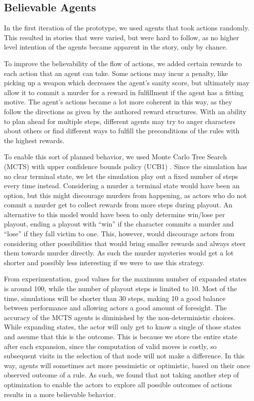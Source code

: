\subsection{Believable Agents}
In the first iteration of the prototype, we used agents that took actions randomly. This resulted in stories that were varied, but were hard to follow, as no higher level intention of the agents became apparent in the story, only by chance.

To improve the believability of the flow of actions, we added certain rewards to each action that an agent can take. Some actions may incur a penalty, like picking up a weapon which decreases the agent's sanity score, but ultimately may allow it to commit a murder for a reward in fulfillment if the agent has a fitting motive. The agent's actions became a lot more coherent in this way, as they follow the directions as given by the authored reward structures. With an ability to plan ahead for multiple steps, different agents may try to anger characters about others or find different ways to fulfill the preconditions of the rules with the highest rewards. 

To enable this sort of planned behavior, we used Monte Carlo Tree Search (MCTS) with upper confidence bounds policy (UCB1) \cite{Auer2002}.
Since the simulation has no clear terminal state, we let the simulation play out a fixed number of steps every time instead.
Considering a murder a terminal state would have been an option, but this might discourage murders from happening, as actors who do not commit a murder get to collect rewards from more steps during playout.
An alternative to this model would have been to only determine win/lose per playout, ending a playout with \enquote{win} if the character commits a murder and \enquote{lose} if they fall victim to one.
This, however, would discourage actors from considering other possibilities that would bring smaller rewards and always steer them towards murder directly.
As such the murder mysteries would get a lot shorter and possibly less interesting if we were to use this strategy.

From experimentation, good values for the maximum number of expanded states is around 100, while the number of playout steps is limited to 10.
Most of the time, simulations will be shorter than 30 steps, making 10 a good balance between performance and allowing actors a good amount of foresight.
The accuracy of the MCTS agents is diminished by the non-deterministic choices.
While expanding states, the actor will only get to know a single of those states and assume that this is the outcome.
This is because we store the entire state after each expansion, since the computation of valid moves is costly, so subsequent visits in the selection of that node will not make a difference.
In this way, agents will sometimes act more pessimistic or optimistic, based on their once observed outcome of a rule.
As such, we found that not taking another step of optimization to enable the actors to explore all possible outcomes of actions results in a more believable behavior.

